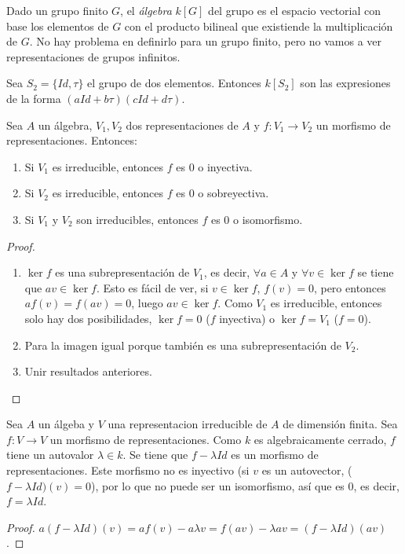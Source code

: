 \documentclass[ANAyTR.tex]{subfiles}
\begin{document}
\begin{defi}
Dado un grupo finito $G$, el \emph{álgebra} $k[G]$ del grupo es el espacio vectorial con base los elementos de $G$ con el producto bilineal que existiende la multiplicación de $G$. No hay problema en definirlo para un grupo finito, pero no vamos a ver representaciones de grupos infinitos. 
\end{defi}

\begin{ej}
Sea $S_2=\{Id,\tau\}$ el grupo de dos elementos. Entonces $k[S_2]$ son las expresiones de la forma $(aId+b\tau)(cId+d\tau)$. 
\end{ej}

\begin{lemma}[de Schur]
Sea $A$ un álgebra, $V_1,V_2$ dos representaciones de $A$ y $f:V_1\to V_2$ un morfismo de representaciones. Entonces:
\begin{enumerate}
\item Si $V_1$ es irreducible, entonces $f$ es 0 o inyectiva.
\item Si $V_2$ es irreducible, entonces $f$ es 0 o sobreyectiva.
\item Si $V_1$ y $V_2$ son irreducibles, entonces $f$ es 0 o isomorfismo. 
\end{enumerate}
\end{lemma}
\begin{proof}\
\begin{enumerate}
\item $\ker f$ es una subrepresentación de $V_1$, es decir, $\forall a\in A$ y $\forall v\in\ker f$ se tiene que $av\in\ker f$. Esto es fácil de ver, si $v\in\ker f$, $f(v)=0$, pero entonces $af(v)=f(av)=0$, luego $av\in\ker f$. Como $V_1$ es irreducible, entonces solo hay dos posibilidades, $\ker f=0$ ($f$ inyectiva) o $\ker f=V_1$ ($f=0$). 
\item Para la imagen igual porque también es una subrepresentación de $V_2$.
\item Unir resultados anteriores. 
\end{enumerate}
\end{proof}

\begin{coro}
Sea $A$ un álgeba y $V$ una representacion irreducible de $A$ de dimensión finita. Sea $f:V\to V$ un morfismo de representaciones. Como $k$ es algebraicamente cerrado, $f$ tiene un autovalor $\lambda\in k$. Se tiene que $f-\lambda Id$ es un morfismo de representaciones. Este morfismo no es inyectivo (si $v$ es un autovector, ($f-\lambda Id)(v)=0$), por lo que no puede ser un isomorfismo, así que es 0, es decir, $f=\lambda Id$. 
\end{coro}
\begin{proof}
$a(f-\lambda Id)(v)=af(v)-a\lambda v=f(av)-\lambda av=(f-\lambda Id)(av)$.
\end{proof}
\end{document}
